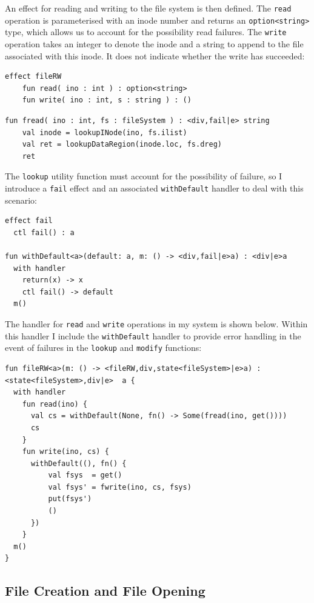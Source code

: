 \documentclass[logo,bsc,singlespacing,parskip]{infthesis}
\begin{document}
An effect for reading and writing to the file system is then defined. The \lstinline{read} operation is parameterised with an inode number and returns an \lstinline{option<string>} type, which allows us to account for the possibility read failures. The \lstinline{write} operation takes an integer to denote the inode and a string to append to the file associated with this inode. It does not indicate whether the write has succeeded:

\begin{lstlisting}
effect fileRW
    fun read( ino : int ) : option<string>
    fun write( ino : int, s : string ) : ()
\end{lstlisting}

\begin{lstlisting}
fun fread( ino : int, fs : fileSystem ) : <div,fail|e> string
    val inode = lookupINode(ino, fs.ilist)
    val ret = lookupDataRegion(inode.loc, fs.dreg)
    ret
\end{lstlisting}

The \texttt{lookup} utility function must account for the possibility of failure, so I introduce a \texttt{fail} effect and an associated \texttt{withDefault} handler to deal with this scenario:

\begin{lstlisting}
effect fail
  ctl fail() : a

fun withDefault<a>(default: a, m: () -> <div,fail|e>a) : <div|e>a
  with handler
    return(x) -> x
    ctl fail() -> default
  m()
\end{lstlisting}

The  handler for \lstinline{read} and \lstinline{write} operations in my system is shown below. Within this handler I include the  \lstinline{withDefault} handler to provide error handling in the event of failures in the \lstinline{lookup} and \lstinline{modify} functions:


\begin{lstlisting}
fun fileRW<a>(m: () -> <fileRW,div,state<fileSystem>|e>a) : <state<fileSystem>,div|e>  a {
  with handler
    fun read(ino) {
      val cs = withDefault(None, fn() -> Some(fread(ino, get())))
      cs
    }
    fun write(ino, cs) {
      withDefault((), fn() {
          val fsys  = get()
          val fsys' = fwrite(ino, cs, fsys)
          put(fsys')
          ()
      })
    }
  m()
}
\end{lstlisting}


\subsection{File Creation and File Opening}
\end{document}
